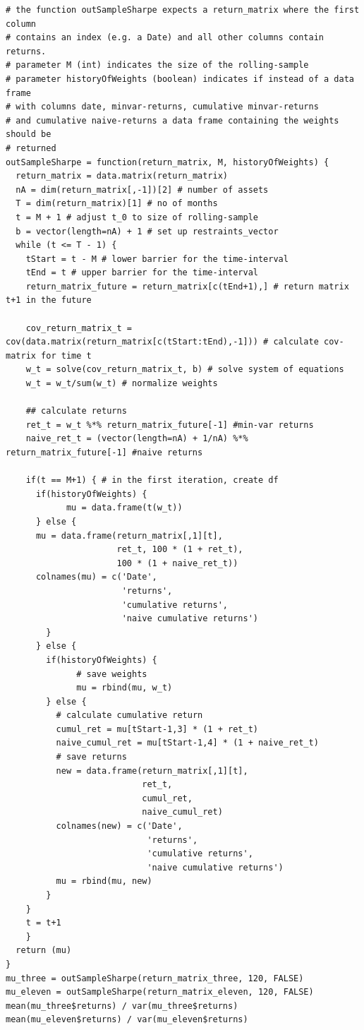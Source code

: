 \begin{lstlisting}[label=code:full-source-code, frame=single]
# the function outSampleSharpe expects a return_matrix where the first column
# contains an index (e.g. a Date) and all other columns contain returns.
# parameter M (int) indicates the size of the rolling-sample
# parameter historyOfWeights (boolean) indicates if instead of a data frame
# with columns date, minvar-returns, cumulative minvar-returns 
# and cumulative naive-returns a data frame containing the weights should be 
# returned
outSampleSharpe = function(return_matrix, M, historyOfWeights) {
  return_matrix = data.matrix(return_matrix)
  nA = dim(return_matrix[,-1])[2] # number of assets
  T = dim(return_matrix)[1] # no of months
  t = M + 1 # adjust t_0 to size of rolling-sample
  b = vector(length=nA) + 1 # set up restraints_vector
  while (t <= T - 1) {
    tStart = t - M # lower barrier for the time-interval
    tEnd = t # upper barrier for the time-interval
    return_matrix_future = return_matrix[c(tEnd+1),] # return matrix t+1 in the future
    
    cov_return_matrix_t = cov(data.matrix(return_matrix[c(tStart:tEnd),-1])) # calculate cov-matrix for time t
    w_t = solve(cov_return_matrix_t, b) # solve system of equations
    w_t = w_t/sum(w_t) # normalize weights
  
    ## calculate returns
    ret_t = w_t %*% return_matrix_future[-1] #min-var returns
    naive_ret_t = (vector(length=nA) + 1/nA) %*% return_matrix_future[-1] #naive returns
  
    if(t == M+1) { # in the first iteration, create df
      if(historyOfWeights) {
            mu = data.frame(t(w_t))
      } else {
      mu = data.frame(return_matrix[,1][t], 
                      ret_t, 100 * (1 + ret_t), 
                      100 * (1 + naive_ret_t))
      colnames(mu) = c('Date', 
                       'returns', 
                       'cumulative returns', 
                       'naive cumulative returns')
        }
      } else {
        if(historyOfWeights) {
              # save weights
              mu = rbind(mu, w_t)
        } else {
          # calculate cumulative return
          cumul_ret = mu[tStart-1,3] * (1 + ret_t)
          naive_cumul_ret = mu[tStart-1,4] * (1 + naive_ret_t)
          # save returns
          new = data.frame(return_matrix[,1][t], 
                           ret_t, 
                           cumul_ret, 
                           naive_cumul_ret)
          colnames(new) = c('Date', 
                            'returns', 
                            'cumulative returns', 
                            'naive cumulative returns')
          mu = rbind(mu, new)
        }
    }
    t = t+1
    }
  return (mu)
}
mu_three = outSampleSharpe(return_matrix_three, 120, FALSE)
mu_eleven = outSampleSharpe(return_matrix_eleven, 120, FALSE)
mean(mu_three$returns) / var(mu_three$returns)
mean(mu_eleven$returns) / var(mu_eleven$returns)


\end{lstlisting}

